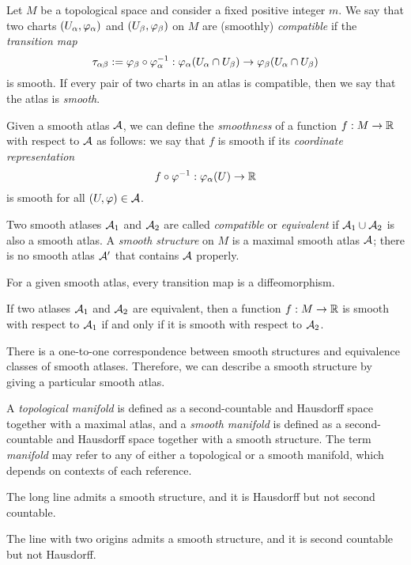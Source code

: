 \documentclass{../../large}
\begin{document}
\begin{prb}
Let $M$ be a topological space and consider a fixed positive integer $m$.
We say that two charts $(U_\alpha,\varphi_\alpha)$ and $(U_\beta,\varphi_\beta)$ on $M$ are (smoothly) \emph{compatible} if the \emph{transition map}
\[\tau_{\alpha\beta}:=\varphi_\beta\circ\varphi_\alpha^{-1}:\varphi_\alpha(U_\alpha\cap U_\beta)\to\varphi_\beta(U_\alpha\cap U_\beta)\]
is smooth.
If every pair of two charts in an atlas is compatible, then we say that the atlas is \emph{smooth}.

Given a smooth atlas $\mathcal{A}$, we can define the \emph{smoothness} of a function $f:M\to\mathbb{R}$ with respect to $\mathcal{A}$ as follows: we say that $f$ is smooth if its \emph{coordinate representation}
\[f\circ\varphi^{-1}:\varphi_\alpha(U)\to\mathbb{R}\]
is smooth for all $(U,\varphi)\in\mathcal{A}$.

Two smooth atlases $\mathcal{A}_1$ and $\mathcal{A}_2$ are called \emph{compatible} or \emph{equivalent} if $\mathcal{A}_1\cup\mathcal{A}_2$ is also a smooth atlas.
A \emph{smooth structure} on $M$ is a maximal smooth atlas $\mathcal{A}$; there is no smooth atlas $\mathcal{A}'$ that contains $\mathcal{A}$ properly.
\begin{parts}
\item For a given smooth atlas, every transition map is a diffeomorphism.
\item If two atlases $\mathcal{A}_1$ and $\mathcal{A}_2$ are equivalent, then a function $f:M\to\mathbb{R}$ is smooth with respect to $\mathcal{A}_1$ if and only if it is smooth with respect to $\mathcal{A}_2$.
\item There is a one-to-one correspondence between smooth structures and equivalence classes of smooth atlases. Therefore, we can describe a smooth structure by giving a particular smooth atlas.
\end{parts}
\end{prb}

\begin{prb}[Manifolds]
A \emph{topological manifold} is defined as a second-countable and Hausdorff space together with a maximal atlas, and a \emph{smooth manifold} is defined as a second-countable and Hausdorff space together with a smooth structure.
The term \emph{manifold} may refer to any of either a topological or a smooth manifold, which depends on contexts of each reference.
\begin{parts}
\item The long line admits a smooth structure, and it is Hausdorff but not second countable.
\item The line with two origins admits a smooth structure, and it is second countable but not Hausdorff.
\end{parts}
\end{prb}
\end{document}
